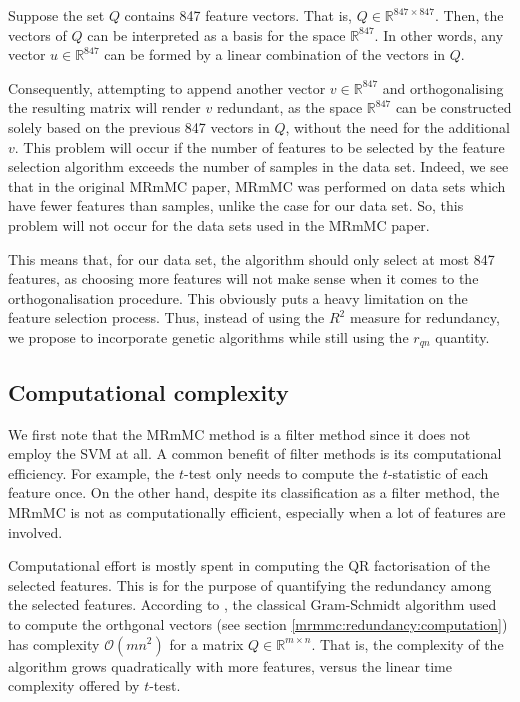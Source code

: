 \documentclass[12pt, twoside, a4paper]{report}
\begin{document}
Suppose the set $Q$ contains 847 feature vectors. That is, $Q \in \mathbb{R}^{847 \times 847}$. Then, the vectors of $Q$ can be interpreted as a basis for the space $\mathbb{R}^{847}$. In other words, any vector $u \in \mathbb{R}^{847}$ can be formed by a linear combination of the vectors in $Q$.

Consequently, attempting to append another vector $v \in \mathbb{R}^{847}$ and orthogonalising the resulting matrix will render $v$ redundant, as the space $\mathbb{R}^{847}$ can be constructed solely based on the previous 847 vectors in $Q$, without the need for the additional $v$. This problem will occur if the number of features to be selected by the feature selection algorithm exceeds the number of samples in the data set. Indeed, we see that in the original MRmMC paper, MRmMC was performed on data sets which have fewer features than samples, unlike the case for our data set. So, this problem will not occur for the data sets used in the MRmMC paper.

This means that, for our data set, the algorithm should only select at most 847 features, as choosing more features will not make sense when it comes to the orthogonalisation procedure. This obviously puts a heavy limitation on the feature selection process. Thus, instead of using the $R^2$ measure for redundancy, we propose to incorporate genetic algorithms while still using the $r_{qn}$ quantity.

\subsection{Computational complexity}

We first note that the MRmMC method is a filter method since it does not employ the SVM at all. A common benefit of filter methods is its computational efficiency. For example, the $t$-test only needs to compute the $t$-statistic of each feature once. On the other hand, despite its classification as a filter method, the MRmMC is not as computationally efficient, especially when a lot of features are involved.

Computational effort is mostly spent in computing the QR factorisation of the selected features. This is for the purpose of quantifying the redundancy among the selected features. According to \cite{RefWorks:253}, the classical Gram-Schmidt algorithm used to compute the orthgonal vectors (see section \ref{mrmmc:redundancy:computation}) has complexity $\mathcal{O}(mn^2)$ for a matrix $Q \in \mathbb{R}^{m \times n}$. That is, the complexity of the algorithm grows quadratically with more features, versus the linear time complexity offered by $t$-test.
\end{document}
